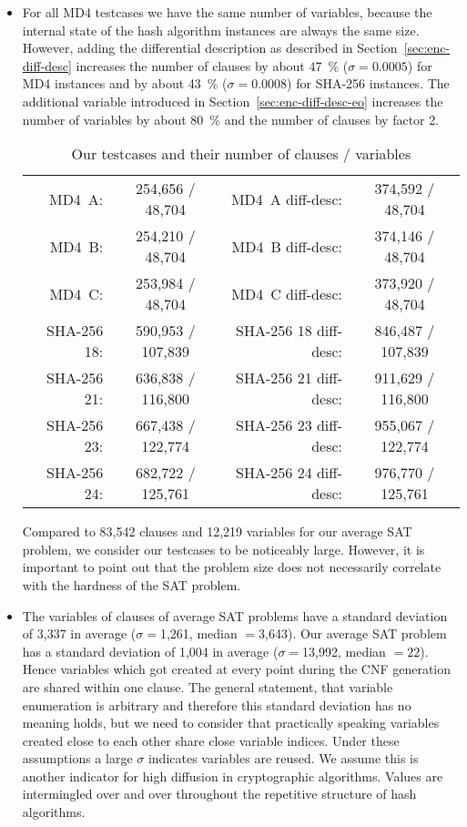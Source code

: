 \begin{itemize}
  \item For all MD4 testcases we have the same number of variables,
    because the internal state of the hash algorithm instances are
    always the same size.
    However, adding the differential description as described in
    Section~\ref{sec:enc-diff-desc} increases the number of clauses
    by about 47~\% ($\sigma = 0.0005$) for MD4 instances and
    by about 43~\% ($\sigma = 0.0008$) for SHA-256 instances.
    The additional variable introduced in Section~\ref{sec:enc-diff-desc-eo}
    increases the number of variables by about 80~\%
    and the number of clauses by factor 2.

    \begin{table}[!h]
      \begin{center}
        \begin{tabular}{rc|rc}
          MD4~A: & 254,656 / 48,704 & MD4~A diff-desc: & 374,592 / 48,704 \\
          MD4~B: & 254,210 / 48,704 & MD4~B diff-desc: & 374,146 / 48,704 \\
          MD4~C: & 253,984 / 48,704 & MD4~C diff-desc: & 373,920 / 48,704 \\
          SHA-256 18: & 590,953 / 107,839 & SHA-256 18 diff-desc: & 846,487 / 107,839 \\
          SHA-256 21: & 636,838 / 116,800 & SHA-256 21 diff-desc: & 911,629 / 116,800 \\
          SHA-256 23: & 667,438 / 122,774 & SHA-256 23 diff-desc: & 955,067 / 122,774 \\
          SHA-256 24: & 682,722 / 125,761 & SHA-256 24 diff-desc: & 976,770 / 125,761
        \end{tabular}
        \caption{Our testcases and their number of clauses / variables}
      \end{center}
    \end{table}

    Compared to 83,542 clauses and 12,219 variables for our average SAT problem,
    we consider our testcases to be noticeably large. However, it is important to
    point out that the problem size does not necessarily correlate with
    the hardness of the SAT problem.

  \item The variables of clauses of average SAT problems
    have a standard deviation of 3,337 in average ($\sigma=$1,261, median $=$3,643).
    Our average SAT problem has a standard deviation of 1,004 in average
    ($\sigma=$13,992, median $=22$). Hence variables which got created at every
    point during the CNF generation are shared within one clause.
    The general statement, that variable enumeration is arbitrary
    and therefore this standard deviation has no meaning holds, but we need
    to consider that practically speaking variables created close to each
    other share close variable indices.
    Under these assumptions a large $\sigma$ indicates variables are reused.
    We assume this is another indicator for high diffusion in cryptographic
    algorithms. Values are intermingled over and over throughout the repetitive
    structure of hash algorithms.


\end{itemize}
